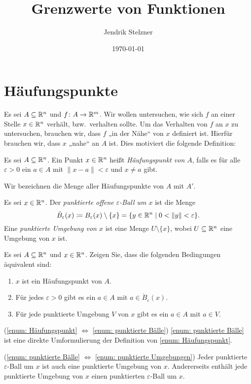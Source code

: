 \documentclass[a4paper,10pt]{article}
\title{Grenzwerte von Funktionen}
\author{Jendrik Stelzner}
\date{\today}
\begin{document}
\maketitle

\tableofcontents





\section{Häufungspunkte}


Es sei $A \subseteq \mathbb{R}^n$ und $f \colon A \to \mathbb{R}^m$. Wir wollen untersuchen, wie sich $f$ an einer Stelle $x \in \mathbb{R}^n$ verhält, bzw.\ verhalten sollte. Um das Verhalten von $f$ an $x$ zu untersuchen, brauchen wir, dass $f$ „in der Nähe“ von $x$ definiert ist. Hierfür brauchen wir, dass $x$ „nahe“ an $A$ ist. Dies motiviert die folgende Definition:


\begin{defi}
 Es sei $A \subseteq \mathbb{R}^n$. Ein Punkt $x \in \mathbb{R}^n$ heißt \emph{Häufungspunkt von $A$}, falls es für alle $\varepsilon > 0$ ein $a \in A$ mit $\|x-a\| < \varepsilon$ und $x \neq a$ gibt.
 
 Wir bezeichnen die Menge aller Häufungspunkte von $A$ mit $A'$.
\end{defi}


\begin{question}
 Es sei $x \in \mathbb{R}^n$. Der \emph{punktierte offene $\varepsilon$-Ball um $x$} ist die Menge
 \[
  \dot{B}_\varepsilon(x) \coloneqq B_\varepsilon(x) \setminus \{x\} = \{y \in \mathbb{R}^n \mid 0 < \|y\| < \varepsilon\}.
 \]
 Eine \emph{punktierte Umgebung von $x$} ist eine Menge $U \setminus \{x\}$, wobei $U \subseteq \mathbb{R}^n$ eine Umgebung von $x$ ist.
 
 Es sei $A \subseteq \mathbb{R}^n$ und $x \in \mathbb{R}^n$. Zeigen Sie, dass die folgenden Bedingungen äquivalent sind:
 \begin{enumerate}
  \item\label{enum: Häufungspunkt}
   $x$ ist ein Häufungspunkt von $A$.
  \item\label{enum: punktierte Bälle}
   Für jedes $\varepsilon > 0$ gibt es ein $a \in A$ mit $a \in \dot{B}_\varepsilon(x)$.
  \item\label{enum: punktierte Umgebungen}
   Für jede punktierte Umgebung $V$ von $x$ gibt es ein $a \in A$ mit $a \in V$.
 \end{enumerate}
\end{question}
\begin{solution}
 (\ref{enum: Häufungspunkt} $\Leftrightarrow$ \ref{enum: punktierte Bälle}) \ref{enum: punktierte Bälle} ist eine direkte Umformulierung der Definition von \ref{enum: Häufungspunkt}.
 
 (\ref{enum: punktierte Bälle} $\Leftrightarrow$ \ref{enum: punktierte Umgebungen}) Jeder punktierte $\varepsilon$-Ball um $x$ ist auch eine punktierte Umgebung von $x$. Andererseits enthält jede punktierte Umgebung von $x$ einen punktierten $\varepsilon$-Ball um $x$.
\end{solution}
\end{document}
